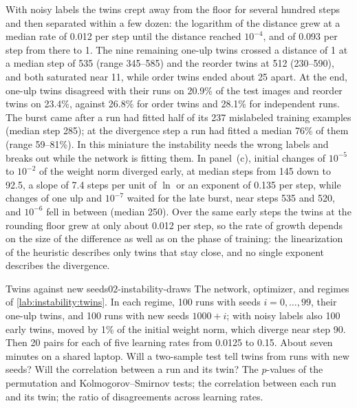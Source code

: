 \begin{refsection}
With noisy labels the twins crept away from the floor for several hundred steps and then separated within a few dozen: the logarithm of the distance grew at a median rate of 0.012 per step until the distance reached $10^{-4}$, and of 0.093 per step from there to 1. The nine remaining one-ulp twins crossed a distance of 1 at a median step of 535 (range 345--585) and the reorder twins at 512 (230--590), and both saturated near 11, while order twins ended about 25 apart. At the end, one-ulp twins disagreed with their runs on 20.9\% of the test images and reorder twins on 23.4\%, against 26.8\% for order twins and 28.1\% for independent runs. The burst came after a run had fitted half of its 237 mislabeled training examples (median step 285); at the divergence step a run had fitted a median 76\% of them (range 59--81\%). In this miniature the instability needs the wrong labels and breaks out while the network is fitting them. In panel~(c), initial changes of $10^{-5}$ to $10^{-2}$ of the weight norm diverged early, at median steps from 145 down to 92.5, a slope of 7.4 steps per unit of $\ln$ or an exponent of 0.135 per step, while changes of one ulp and $10^{-7}$ waited for the late burst, near steps 535 and 520, and $10^{-6}$ fell in between (median 250). Over the same early steps the twins at the rounding floor grew at only about 0.012 per step, so the rate of growth depends on the size of the difference as well as on the phase of training: the linearization of the heuristic describes only twins that stay close, and no single exponent describes the divergence.

\begin{lab}{Twins against new seeds}{02-instability-draws}\label{lab:instability:draws}
 The network, optimizer, and regimes of \cref{lab:instability:twins}. In each regime, 100 runs with seeds $i=0,\dots,99$, their one-ulp twins, and 100 runs with new seeds $1000+i$; with noisy labels also 100 early twins, moved by 1\% of the initial weight norm, which diverge near step 90. Then 20 pairs for each of five learning rates from 0.0125 to 0.15. About seven minutes on a shared laptop.
 Will a two-sample test tell twins from runs with new seeds? Will the correlation between a run and its twin?
 The $p$-values of the permutation and Kolmogorov--Smirnov tests; the correlation between each run and its twin; the ratio of disagreements across learning rates.
\end{lab}


\end{refsection}
